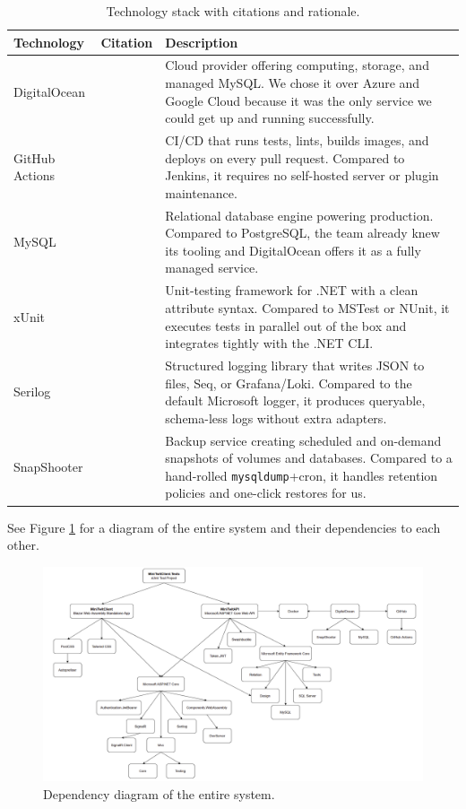 \begin{table}[H]
\centering
\begin{tabularx}{\linewidth}{@{}p{3cm}p{1.5cm}X@{}}
\toprule
\textbf{Technology} & \textbf{Citation} & \textbf{Description}\\
\midrule
DigitalOcean & \cite{digitalocean} & Cloud provider offering computing, storage, and managed MySQL. We chose it over Azure and Google Cloud because it was the only service we could get up and running successfully.\\\midrule
GitHub Actions & \cite{github_actions} & CI/CD that runs tests, lints, builds images, and deploys on every pull request. Compared to Jenkins, it requires no self-hosted server or plugin maintenance.\\\midrule
MySQL & \cite{mysql} & Relational database engine powering production. Compared to PostgreSQL, the team already knew its tooling and DigitalOcean offers it as a fully managed service.\\\midrule
xUnit & \cite{xUnit} & Unit-testing framework for .NET with a clean attribute syntax. Compared to MSTest or NUnit, it executes tests in parallel out of the box and integrates tightly with the .NET CLI.\\\midrule
Serilog & \cite{serilog} & Structured logging library that writes JSON to files, Seq, or Grafana/Loki. Compared to the default Microsoft logger, it produces queryable, schema-less logs without extra adapters.\\\midrule
SnapShooter & \cite{snapshooter} & Backup service creating scheduled and on-demand snapshots of volumes and databases. Compared to a hand-rolled \texttt{mysqldump}+cron, it handles retention policies and one-click restores for us.\\
\bottomrule
\end{tabularx}
\caption{Technology stack with citations and rationale.}
\end{table}

See Figure \ref{fig:DependencyDiagram} for a diagram of the entire system and their dependencies to each other.

\begin{figure}[H]
    \centering
    \includegraphics[width=1\linewidth]{images/DependecyDiagram.png}
    \caption{Dependency diagram of the entire system.}
    \label{fig:DependencyDiagram}
\end{figure}